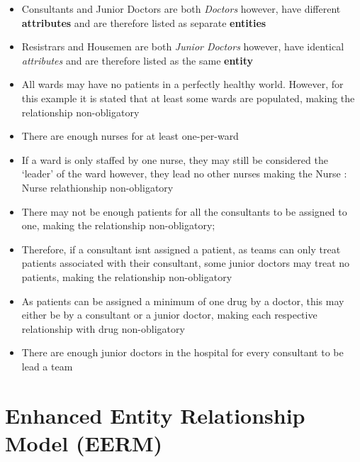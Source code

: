 \documentclass[11pt, english]{article}
\begin{document}
	\begin{itemize}
	\setlength\itemsep{0cm}
		\item Consultants and Junior Doctors are both \textit{Doctors} however, have different \textbf{attributes} and are therefore listed as separate \textbf{entities}
		\item Resistrars and Housemen are both \textit{Junior Doctors} however, have identical \textit{attributes} and are therefore listed as the same \textbf{entity}
		\item All wards may have no patients in a perfectly healthy world. However, for this example it is stated that at least some wards are populated, making the relationship non-obligatory
		\item There are enough nurses for at least one-per-ward
		\item If a ward is only staffed by one nurse, they may still be considered the `leader' of the ward however, they lead no other nurses making the Nurse : Nurse relathionship non-obligatory
		\item There may not be enough patients for all the consultants to be assigned to one, making the relationship non-obligatory;
		\item Therefore, if a consultant isnt assigned a patient, as teams can only treat patients associated with their consultant, some junior doctors may treat no patients, making the relationship non-obligatory
		\item As patients can be assigned a minimum of one drug by a doctor, this may either be by a consultant or a junior doctor, making each respective relationship with drug non-obligatory
		\item There are enough junior doctors in the hospital for every consultant to be lead a team
	\end{itemize}

\newpage

\section{Enhanced Entity Relationship Model (EERM)}

	\vspace{\fill}
\end{document}
